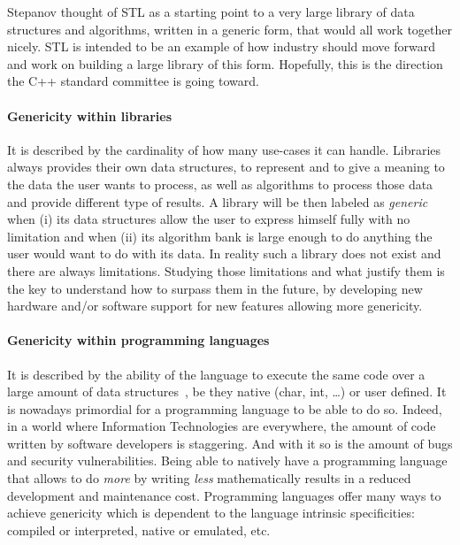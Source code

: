 Stepanov thought of STL as a starting point to a very large library of data structures and algorithms, written in a
generic form, that would all work together nicely. STL is intended to be an example of how industry should move forward
and work on building a large library of this form. Hopefully, this is the direction the C++ standard committee is going
toward.

\paragraph{Genericity within libraries} It is described by the cardinality of how many use-cases it can handle.
Libraries always provides their own data structures, to represent and to give a meaning to the data the user wants to
process, as well as algorithms to process those data and provide different type of results. A library will be then
labeled as \emph{generic}~\parencite{musser.1994.algorithm} when (i) its data structures allow the user to express
himself fully with no limitation and when (ii) its algorithm bank is large enough to do anything the user would want to
do with its data. In reality such a library does not exist and there are always limitations. Studying those limitations
and what justify them is the key to understand how to surpass them in the future, by developing new hardware and/or
software support for new features allowing more genericity.

\paragraph{Genericity within programming languages} It is described by the ability of the language to execute the same
code over a large amount of data structures~\parencite{dehnert.1998.fundamentals}, be they native (char, int, \ldots) or
user defined. It is nowadays primordial for a programming language to be able to do so. Indeed, in a world where
Information Technologies are everywhere, the amount of code written by software developers is staggering. And with it so
is the amount of bugs and security vulnerabilities. Being able to natively have a programming language that allows to do
\emph{more} by writing \emph{less} mathematically results in a reduced development and maintenance cost. Programming
languages offer many ways to achieve genericity which is dependent to the language intrinsic specificities: compiled or
interpreted, native or emulated, etc.

